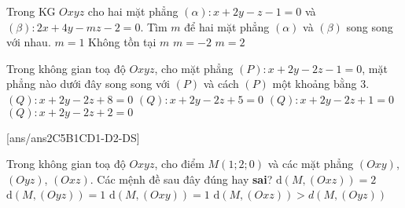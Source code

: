 \begin{ex}%
	Trong KG $Oxyz$ cho hai mặt phẳng $(\alpha)\colon x+2y-z-1=0$ và $(\beta)\colon 2x+4y-mz-2=0$. Tìm $m$ để hai mặt phẳng $(\alpha)$ và $(\beta)$ song song với nhau.
\choice
{$m=1$}
{\True Không tồn tại $m$}
{$m=-2$}
{$m=2$}
\end{ex}

\begin{ex}%
	Trong không gian toạ độ $Oxyz$, cho mặt phẳng $(P)\colon x+2y-2z-1=0$, mặt phẳng nào dưới đây song song với $(P)$ và cách $(P)$ một khoảng bằng $3$.
\choice
{\True $(Q)\colon x+2y-2z+8=0$}
{$(Q)\colon x+2y-2z+5=0$}
{$(Q)\colon x+2y-2z+1=0$}
{$(Q)\colon x+2y-2z+2=0$}
\end{ex}
\TNTF
{}[ans/ans2C5B1CD1-D2-DS]
\begin{ex}%
	Trong không gian toạ độ $Oxyz$, cho điểm $M\left(1;2;0\right)$ và các mặt phẳng $(Oxy)$, $(Oyz)$, $(Oxz)$. Các mệnh đề sau đây đúng hay \textbf{sai}?
\choiceTF
{\True $\mathrm{d}\left(M,(Oxz)\right)=2$}
{\True $\mathrm{d}\left(M,(Oyz)\right)=1$}
{$\mathrm{d}\left(M,(Oxy)\right)=1$}
{\True $\mathrm{d}\left(M,(Oxz)\right)>d\left(M,(Oyz)\right)$}
\end{ex}
